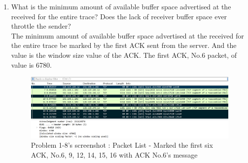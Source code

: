 \begin{enumerate}[label=\bfseries Problem \arabic*:,leftmargin=*,labelindent=1em]
        \item What is the minimum amount of available buffer space advertised at the received for the entire trace? Does the lack of receiver buffer space ever throttle the sender?\\[0.2mm]
        \soln The minimum amount of available buffer space advertised at the received for the entire trace be marked by the first ACK sent from the server. And the value is the window size value of the ACK. The first ACK, No.6 packet, of value is 6780.\\
        \vspace{-4mm}
        \begin{figure}[!h]\centering
        \hspace{15mm}  
    		\includegraphics[width=.85\textwidth]{image/week02/1-8-1.png}
    		\caption{\footnotesize Problem 1-8's screenshot : Packet List - Marked the first six ACK, No.6, 9, 12, 14, 15, 16 with ACK No.6’s message}
    		\vspace{-10pt}
        \end{figure}
        

\end{enumerate}
